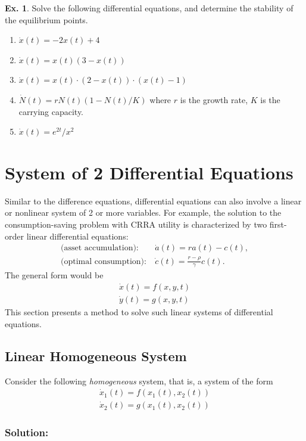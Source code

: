 \documentclass[11pt,a4paper]{book}
\theoremstyle{definition}\newtheorem{definition}{Definition}
\theoremstyle{definition}\newtheorem{fact}{Fact}
\theoremstyle{definition}\newtheorem{remark}{Remark}
\theoremstyle{definition}\newtheorem{ex}{Ex.}
\theoremstyle{definition}\newtheorem{project}{Project}
\theoremstyle{definition}\newtheorem{problem}{Problem}
\theoremstyle{definition}\newtheorem{example}{Example}
\numberwithin{theorem}{section}
\numberwithin{corollary}{chapter}
\numberwithin{assumption}{chapter}
\numberwithin{definition}{chapter}
\numberwithin{prop}{chapter}
\numberwithin{notation}{chapter}
\numberwithin{problem}{chapter}
\numberwithin{example}{chapter}
\numberwithin{fact}{chapter}
\numberwithin{ex}{chapter}
\begin{document}
	\begin{ex}
		Solve the following differential equations, and determine the stability of the equilibrium points.
		\begin{enumerate}
			\item $\dot{x}(t) = -2 x(t) + 4$
			\item $\dot{x}(t) = x(t) (3-x(t)) $
			\item $\dot{x}(t) = x(t) \cdot (2-x(t)) \cdot (x(t)-1)$
			\item $\dot{N}(t) = rN(t)(1 - N(t)/K)$ where $r$ is the growth rate, $K$ is the carrying capacity.
			\item $\dot{x}(t) = e^{2t}/x^2$
		\end{enumerate}
	\end{ex}
	
	\section{System of 2 Differential Equations}
	Similar to the difference equations, differential equations can also involve a linear or nonlinear system of 2 or more variables. For example, the solution to the consumption-saving problem with CRRA utility is characterized by two first-order linear differential equations:
	\begin{align*}
		\text{(asset accumulation):} &\ \dot{a}(t) = r a(t) - c(t), \\
		\text{(optimal consumption):} &\ \dot{c}(t) = \frac{r-\rho}{\gamma} c(t).
	\end{align*}
	The general form would be
	\begin{align*}
		\dot{x}(t) = f(x, y, t) \\
		\dot{y}(t) = g(x, y ,t)
	\end{align*}
	This section presents a method to solve such linear systems of differential
 equations.
	
	\subsection{Linear Homogeneous System}
	Consider the following \textit{homogeneous} system, that is, a system of the form
	\begin{align*}
		\dot{x}_1(t) = f(x_1(t), x_2(t)) \\
		\dot{x}_2(t) = g(x_1(t), x_2(t))
	\end{align*}
	
	\subsubsection{Solution:}
	
\end{document}

